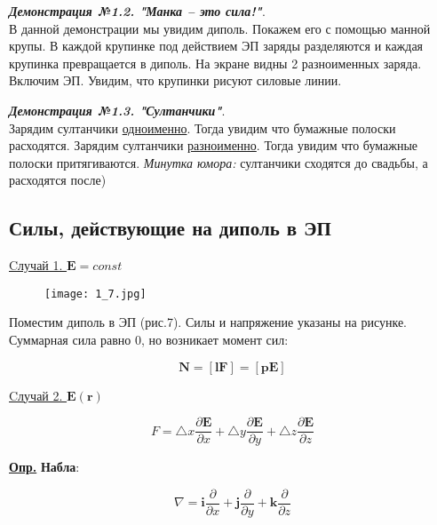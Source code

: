 \large
\textbf{\textit{Демонстрация №1.2. "Манка -- это сила!"}}.\\
\normalsize
В данной демонстрации мы увидим диполь. Покажем его с помощью манной крупы. В каждой крупинке под действием ЭП заряды разделяются и каждая крупинка превращается в диполь. На экране видны 2 разноименных заряда. Включим ЭП.
Увидим, что крупинки рисуют силовые линии. 

\large
\textbf{\textit{Демонстрация №1.3. "Султанчики"}}.\\
\normalsize
Зарядим султанчики \underline{одноименно}. Тогда увидим что бумажные полоски расходятся. 
Зарядим султанчики \underline{разноименно}. Тогда увидим что бумажные полоски притягиваются.
\textit{Минутка юмора:} султанчики сходятся до свадьбы, а расходятся после) 

\subsection{Силы, действующие на диполь в ЭП}

\underline{Cлучай 1. $\mathbf{E} = const$}

\begin{figure}[!ht]
\centering
 \texttt{[image: 1\_7.jpg]}     
 \label{fig:my_label}
 \caption{}
\end{figure}

Поместим диполь в ЭП (рис.7). Силы и напряжение указаны на рисунке. Суммарная сила равно 0, но возникает момент сил:

\begin{equation}\label{opr7}
\mathbf{N} = [\mathbf{l} \mathbf{F}] = [\mathbf{p} \mathbf{E}]
\end{equation}



\underline{Cлучай 2. $\mathbf{E} (\mathbf{r})$}

\begin{equation}\label{opr8}
F = \triangle x \frac{\partial \mathbf{E}}{\partial x} + \triangle y \frac{\partial \mathbf{E}}{\partial y} + \triangle z \frac{\partial \mathbf{E}}{\partial z}
\end{equation}

\colorbox{faded}{\underline{\textbf{Опр.}}} \textbf{Набла}:

\begin{equation}\label{opr9}
\nabla = \mathbf{i}  \frac{\partial}{\partial x} + \mathbf{j} \frac{\partial}{\partial y} + \mathbf{k} \frac{\partial}{\partial z}
\end{equation}

